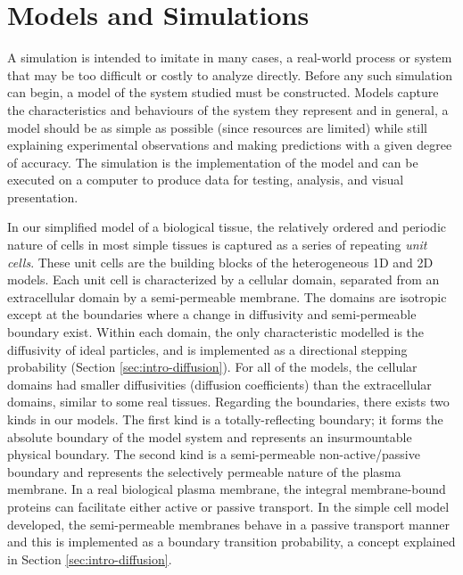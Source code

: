 \chapter{Models and Simulations}
	\label{sec:mods-sims}
	
	A simulation is intended to imitate in many cases, a real-world process or system that may be too difficult or costly to analyze directly. Before any such simulation can begin, a model of the system studied must be constructed. Models capture the characteristics and behaviours of the system they represent and in general, a model should be as simple as possible (since resources are limited) while still explaining experimental observations and making predictions with a given degree of accuracy. The simulation is the implementation of the model and can be executed on a computer to produce data for testing, analysis, and visual presentation.

	In our simplified model of a biological tissue, the relatively ordered and periodic nature of cells in most simple tissues is captured as a series of repeating \textsl{unit cells}. These unit cells are the building blocks of the heterogeneous 1D and 2D models. Each unit cell is characterized by a cellular domain, separated from an extracellular domain by a semi-permeable membrane. The domains are isotropic except at the boundaries where a change in diffusivity and semi-permeable boundary exist. Within each domain, the only characteristic modelled is the diffusivity of ideal particles, and is implemented as a directional stepping probability (Section \ref{sec:intro-diffusion}). For all of the models, the cellular domains had smaller diffusivities (diffusion coefficients) than the extracellular domains, similar to some real tissues. Regarding the boundaries, there exists two kinds in our models. The first kind is a totally-reflecting boundary; it forms the absolute boundary of the model system and represents an insurmountable physical boundary. The second kind is a semi-permeable non-active/passive boundary and represents the selectively permeable nature of the plasma membrane. In a real biological plasma membrane, the integral membrane-bound proteins can facilitate either active or passive transport. In the simple cell model developed, the semi-permeable membranes behave in a passive transport manner and this is implemented as a boundary transition probability, a concept explained in Section \ref{sec:intro-diffusion}.
	
